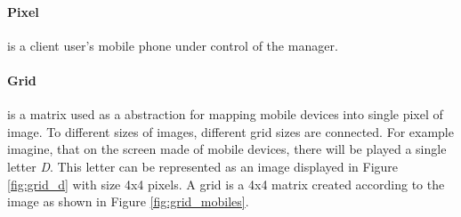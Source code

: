 \paragraph{Pixel} is a client user's mobile phone under control of the manager.

\paragraph{Grid} is a matrix used as a abstraction for mapping mobile devices into single pixel of image.
To different sizes of images, different grid sizes are connected. 
For example imagine, that on the screen made of mobile devices, there will be played a single letter \emph{D}.
This letter can be represented as an image displayed in Figure \ref{fig:grid_d} with size 4x4 pixels.
A grid is a 4x4 matrix created according to the image as shown in Figure \ref{fig:grid_mobiles}.

